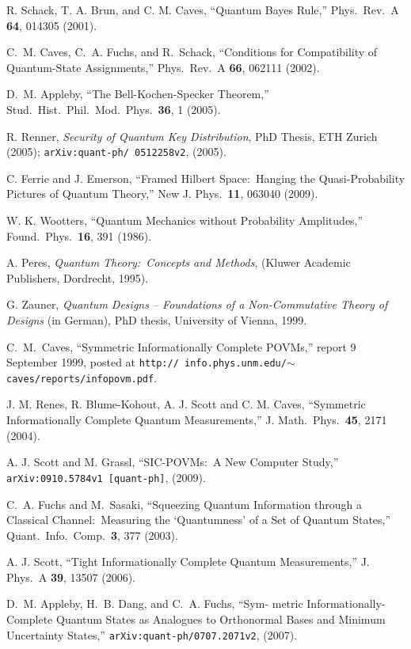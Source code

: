 \begin{thebibliography}{100}
R. Schack, T. A. Brun, and C. M. Caves, ``Quantum Bayes Rule,'' Phys.\ Rev.\ A {\bf 64}, 014305 (2001).

C.~M. Caves, C.~A. Fuchs, and R.~Schack, ``Conditions for Compatibility of Quantum-State Assignments,'' Phys.\ Rev.\ A {\bf 66}, 062111 (2002).

D.~M. Appleby, ``The Bell-Kochen-Specker Theorem,'' Stud.\ Hist.\ Phil.\ Mod.\ Phys.\ {\bf 36}, 1 (2005).

R. Renner, {\sl Security of Quantum Key Distribution}, PhD Thesis, ETH Zurich (2005); {\tt arXiv:quant-ph/ 0512258v2}, (2005).

C. Ferrie and J. Emerson, ``Framed Hilbert Space:\ Hanging the Quasi-Probability Pictures of Quantum Theory,'' New J. Phys.\ {\bf 11}, 063040 (2009).

W. K. Wootters, ``Quantum Mechanics without Probability Amplitudes,'' Found.\ Phys.\ {\bf 16}, 391 (1986).

A. Peres, {\sl Quantum Theory:\ Concepts and Methods}, (Kluwer Academic Publishers, Dordrecht, 1995).

G. Zauner, {\sl Quantum Designs -- Foundations of a Non-Commutative Theory of Designs} (in German), PhD thesis, University of Vienna, 1999.

C.~M.~Caves, ``Symmetric Informationally Complete POVMs,'' report 9 September 1999, posted at {\tt http:// info.phys.unm.edu/$\sim$caves/reports/infopovm.pdf}.

J. M. Renes, R. Blume-Kohout, A. J. Scott and C. M. Caves, ``Symmetric Informationally Complete Quantum Measurements,'' J. Math.\ Phys.\ {\bf 45}, 2171 (2004).

A. J. Scott and M. Grassl, ``SIC-POVMs:\ A New Computer Study,'' {\tt arXiv:0910.5784v1 [quant-ph]}, (2009).

C.~A. Fuchs and M.~Sasaki, ``Squeezing Quantum Information through a Classical Channel:\ Measuring the `Quantumness' of a Set of Quantum
States,'' Quant.\ Info.\ Comp.\ {\bf 3}, 377 (2003).

A. J. Scott, ``Tight Informationally Complete Quantum Measurements,'' J. Phys.\ A {\bf 39}, 13507 (2006).

D.~M. Appleby, H.~B. Dang, and C.~A. Fuchs, ``Sym- metric Informationally-Complete Quantum States as Analogues to Orthonormal
Bases and Minimum Uncertainty States,'' {\tt arXiv:quant-ph/0707.2071v2}, (2007).


\end{thebibliography}
